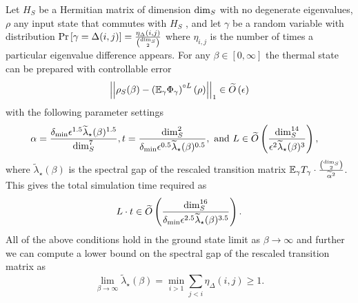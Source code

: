 \begin{theorem} \label{thm:perfect_knowledge}
    Let $H_S$ be a Hermitian matrix of dimension ${\rm dim}_S$ with no degenerate eigenvalues, $\rho$ any input state that commutes with $H_S$ , and let $\gamma$ be a random variable with distribution $\text{Pr}\left[ \gamma = \Delta(i,j) \right] = \frac{\eta_\Delta(i,j)}{\binom{\dim_S}{2}}$ where $\eta_{i,j}$ is the number of times a particular eigenvalue difference appears. For any $\beta\in [0,\infty]$ the thermal state can be prepared with controllable error
    \begin{equation}
        \left| \left| \rho_S(\beta) - \left(\mathbb{E}_\gamma \Phi_\gamma \right)^{\circ L}(\rho) \right| \right|_1 \in \widetilde{O} \left( \epsilon \right)
    \end{equation}
     with the following parameter settings
     \begin{align}
         \alpha &= \frac{\delta_{\min} \epsilon^{1.5} \widetilde{\lambda}_\star(\beta)^{1.5}}{\dim_S^7}, t = \frac{\dim_S^2}{\delta_{\min} \epsilon^{0.5} \widetilde{\lambda}_\star(\beta)^{0.5}},\text{ and } L \in \widetilde{O} \left( \frac{\dim_S^{14}}{\epsilon^2 \widetilde{\lambda}_\star(\beta)^3} \right),
     \end{align}
     where $\widetilde{\lambda}_\star(\beta)$ is the spectral gap of the rescaled transition matrix $\mathbb{E}_\gamma T_\gamma  \cdot \frac{\binom{\dim_S}{2}}{\widetilde{\alpha}^2}$. 
     This gives the total simulation time required as
     \begin{equation}
         L \cdot t \in \widetilde{O} \left( \frac{\dim_S^{16}}{\delta_{\min} \epsilon^{2.5} \widetilde{\lambda}_\star(\beta)^{3.5}} \right).
     \end{equation}
     All of the above conditions hold in the ground state limit as $\beta \to \infty$ and further we can compute a lower bound on the spectral gap of the rescaled transition matrix as
     \begin{equation}
         \lim_{\beta \to \infty} \widetilde{\lambda}_\star(\beta) = \min_{i > 1} \sum_{j < i} \eta_\Delta(i,j) \ge 1.
     \end{equation}
\end{theorem}
